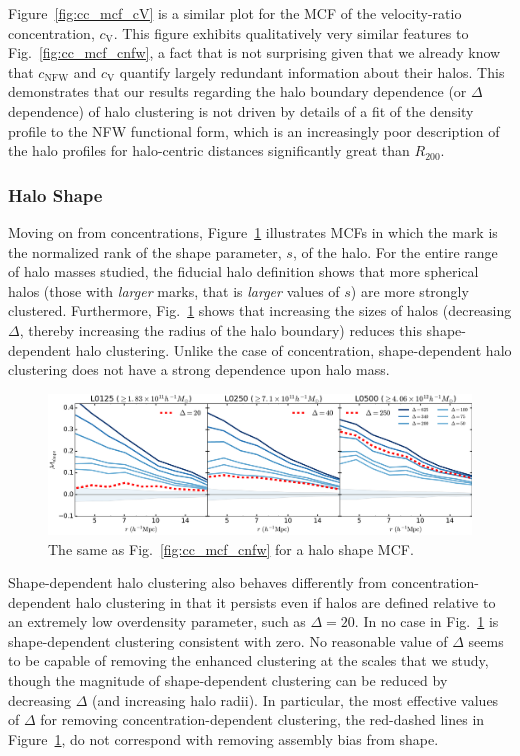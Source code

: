 \documentclass[usenatbib,fleqn]{mnras}
\begin{document}
Figure~\ref{fig:cc_mcf_cV} is a similar plot for the MCF of the velocity-ratio concentration, $c_{\mathrm{V}}$. This figure exhibits qualitatively very similar features to Fig.~\ref{fig:cc_mcf_cnfw}, a fact that is not surprising given that we already know that $c_{\mathrm{NFW}}$ and $c_{\mathrm{V}}$ quantify largely redundant information about their halos. This demonstrates that our results regarding the halo boundary dependence (or $\Delta$ dependence) of halo clustering is not driven by details of a fit of the density profile to the NFW functional form, which is an increasingly poor description of the halo profiles for halo-centric distances significantly great than $R_{200}$. 

\subsubsection{Halo Shape}

Moving on from concentrations, Figure~\ref{fig:cc_mcf_s} illustrates MCFs in which the mark is the normalized rank of the shape parameter, $s$, of the halo. For the entire range of halo masses studied, the fiducial halo definition shows that more spherical halos (those with {\em larger} marks, that is {\em larger} values of $s$) are more strongly clustered. Furthermore, Fig.~\ref{fig:cc_mcf_s} shows that increasing the sizes of halos (decreasing $\Delta$, thereby increasing the radius of the halo boundary) reduces this shape-dependent halo clustering. Unlike the case of concentration, shape-dependent halo clustering does not have a strong dependence upon halo mass.

\begin{figure}
	\centering
	\includegraphics[width=\textwidth]{all_mcf_shape.pdf}
	\caption{
The same as Fig.~\ref{fig:cc_mcf_cnfw} for a halo shape MCF.
}
	\label{fig:cc_mcf_s}
\end{figure}


Shape-dependent halo clustering also behaves differently from concentration-dependent halo clustering in that it persists even if halos are defined relative to an extremely low overdensity parameter, such as $\Delta=20$. In no case in Fig.~\ref{fig:cc_mcf_s} is shape-dependent clustering consistent with zero. No reasonable value of $\Delta$ seems to be capable of removing the enhanced clustering at the scales that we study, though the magnitude of shape-dependent clustering can be reduced by decreasing $\Delta$ (and increasing halo radii). In particular, the most effective values of $\Delta$ for removing concentration-dependent clustering, the red-dashed lines in Figure~\ref{fig:cc_mcf_s}, do not correspond with removing assembly bias from shape. 
\end{document}
